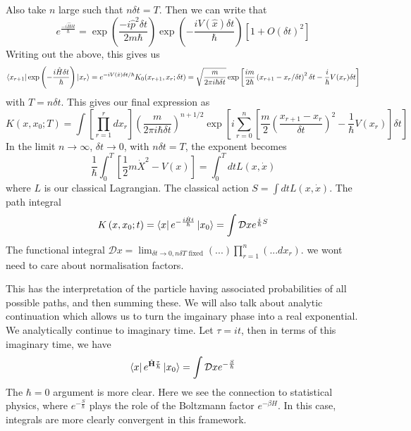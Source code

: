 \documentclass[11pt, oneside]{article}   	%
\theoremstyle{slanted}
\newcommand{\planck}{\hbar}
\renewcommand{\op}[1]{\hat{\mathbf{#1}}}
\begin{document}
Also take $ n $ large such that $ n \delta t  = T $. 
Then we can write that 
\[
e ^{ \frac{ - i \hat{ H } \delta t }{ \planck } }  = \exp\left( \frac{ 
- i \hat{ p } ^ 2 \delta t }{ 2 m \planck }  \right)  \exp\left( 
- \frac{ i V ( \hat{ x } ) \delta t }{ \planck }\right) \left[  
1 + O ( \delta t ) ^ 2  \right]  
\] 
Writing out the above, this gives us 
\[
\bra{ x _{ r + 1 } } \exp\left(   - \frac{ i \hat{ H } \delta t  }{ \planck } \right)
\ket{ x _ r }  = e ^{  - i V ( \hat{ x } ) \delta t  / \planck } K _ 0 ( 
x _{ r + 1 }, x _ r ; \delta t )  =
\sqrt{ \frac{m}{2 \pi i \planck  \delta t }} \exp
\left[  \frac{ i m }{ 2 \planck} \left( x_{ r + 1 }  - x _ r  / \delta t  \right)^ 2 \delta t 
- \frac{ i  }{\planck} V ( x _r ) \delta t \right] 
\] with $ T = n \delta t $. 
This gives our final expression as 
\[
K \left( x, x_0 ; T  \right)   = 
\int \left[  \prod_{r = 1 }^ r d x _r  \right]  
\left( \frac{m}{ 2 \pi i \planck \delta t }  \right)  ^{ n +1  / 2 } 
\exp \left[  i \sum_{ r = 0 } ^ n \left[  
\frac{m}{ 2} \left( \frac{x_{ r + 1 }  - x _ r }{ \delta t }  \right) ^ 2  - \frac{1}{ \planck}
V ( x _ r ) \right]   \delta t  \right] 
\] In the limit $ n \to \infty $, $ \delta t \to 0 $, 
with $ n \delta t  = T $, the exponent becomes 
\[
\frac{1}{ \planck} \int _ 0 ^ T \left[  
\frac{1}{2 } m \dot{  X  } ^ 2  - V ( x )  \right] = 
\int_ 0 ^ T dt L \left( x , \dot{ x }   \right) 
\] where $ L $ is our classical Lagrangian. 
The classical action $S  = \int dt L ( x , \dot{ x   } )  $. 
The path integral 
\[
K \left( x, x_0 ; t  \right)   = \bra{x }e ^{  - \frac{ i \hat{ H } t }{ \planck}} \ket{ x_0 } =  
\int \mathcal{ D } x e ^{  \frac{i}{\planck} S }
\] The functional integral $ \mathcal{ D } x  = \lim_{ \delta t \to 0 , n \delta T 
\text{ fixed}} \left( ... \right) \prod_{ r = 1 }^{ n } \left( ... dx_r  \right) $. 
we wont need to care about normalisation factors. 

This has the interpretation 
of the particle having associated probabilities of all 
possible paths, and then summing these. 
We will also talk about analytic continuation 
which allows us to turn the imgainary 
phase into a real exponential. 
We analytically continue to imaginary time. 
Let $ \tau  = it $, then in terms 
of this imaginary time, 
we have 
\[
\bra{ x } e ^{ \op{ H }\frac{\tau}{\planck}} \ket{x_0 } 
= \int \mathcal{ D } x e ^{  - \frac{S}{\planck}}
\]
The $ \planck  = 0 $ argument is more clear. 
Here we see the connection to 
statistical physics, where 
$ e ^{  - \frac{S}{\planck } } $ plays the role 
of the Boltzmann factor $ e ^{  -\beta H } $. 
In this case, integrals are more clearly convergent 
in this framework. 
\end{document}
